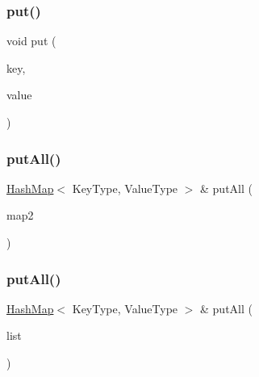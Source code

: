 \subsubsection{\texorpdfstring{put()}{put()}}
{\footnotesize\ttfamily void put (\begin{DoxyParamCaption}\item[{const Key\+Type \&}]{key,  }\item[{const Value\+Type \&}]{value }\end{DoxyParamCaption})}

\mbox{\label{classHashMap_a59da5e6b9b66d6582a03c07254406a40}} 
\subsubsection{\texorpdfstring{put\+All()}{putAll()}\hspace{0.1cm}{\footnotesize\ttfamily [1/2]}}
{\footnotesize\ttfamily \mbox{\hyperlink{classHashMap}{Hash\+Map}}$<$ Key\+Type, Value\+Type $>$ \& put\+All (\begin{DoxyParamCaption}\item[{const \mbox{\hyperlink{classHashMap}{Hash\+Map}}$<$ Key\+Type, Value\+Type $>$ \&}]{map2 }\end{DoxyParamCaption})}

\mbox{\label{classHashMap_aafb5180ad67f0f661d9250ecd2dc16be}} 
\subsubsection{\texorpdfstring{put\+All()}{putAll()}\hspace{0.1cm}{\footnotesize\ttfamily [2/2]}}
{\footnotesize\ttfamily \mbox{\hyperlink{classHashMap}{Hash\+Map}}$<$ Key\+Type, Value\+Type $>$ \& put\+All (\begin{DoxyParamCaption}\item[{std\+::initializer\+\_\+list$<$ std\+::pair$<$ Key\+Type, Value\+Type $>$ $>$}]{list }\end{DoxyParamCaption})}

\mbox{\label{classHashMap_ac6e7e5198a9f1c8b2cc40fbd1d0eb3b0}} 
